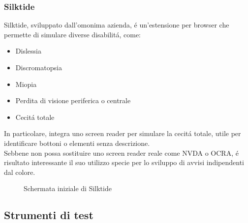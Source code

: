 \documentclass{article}
\begin{document}
\subsubsection*{Silktide}
Silktide, sviluppato dall'omonima azienda, é un'estensione per browser che permette di simulare diverse disabilitá, come:
\begin{itemize}
	\item Dislessia
	\item Discromatopsia
	\item Miopia
	\item Perdita di visione periferica o centrale
	\item Cecitá totale
\end{itemize}
In particolare, integra uno screen reader per simulare la cecitá totale, utile per identificare bottoni o elementi senza descrizione.\\
Sebbene non possa sostituire uno screen reader reale come NVDA o OCRA, é risultato interessante il suo utilizzo specie per lo sviluppo di avvisi indipendenti dal colore.
\begin{figure}[H]
	\centering
	\caption{Schermata iniziale di Silktide}
\end{figure}
\subsection{Strumenti di test}
\end{document}
